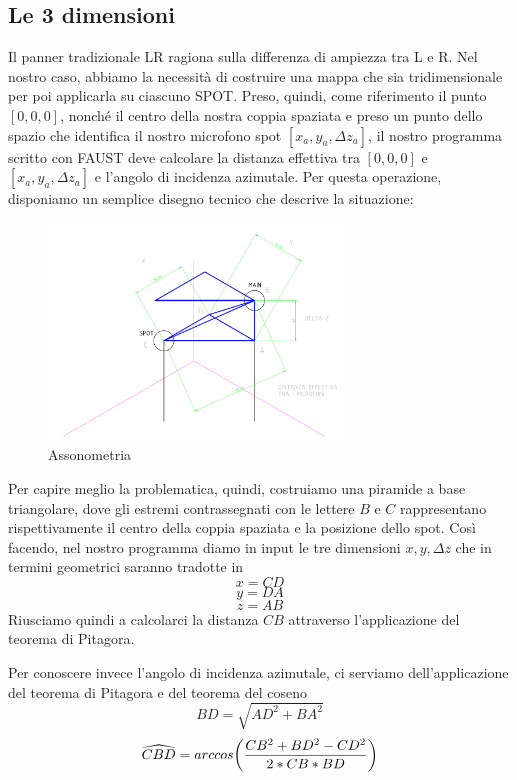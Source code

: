 \documentclass{article}
\begin{document}
    \subsection{Le 3 dimensioni}
    Il panner tradizionale LR ragiona sulla differenza di ampiezza tra L e R. Nel nostro caso, abbiamo la necessità di costruire una mappa che sia tridimensionale per poi applicarla su ciascuno SPOT. Preso, quindi, come riferimento il punto $\left[0,0,0\right]$, nonché il centro della nostra coppia spaziata e preso un punto dello spazio che identifica il nostro microfono spot $\left[x_a,y_a,\Delta z_a\right]$, il nostro programma scritto con FAUST deve calcolare
    la distanza effettiva tra $\left[0,0,0\right]$ e $\left[x_a,y_a,\Delta z_a\right]$ e l'angolo di incidenza azimutale. Per questa operazione, disponiamo un semplice disegno tecnico che descrive la situazione:

    \begin{figure}[H]
        \centering
        \includegraphics[width=0.7\textwidth]{images/Assonometria.png}
         \caption{\label{fig1}Assonometria}
    \end{figure}

    Per capire meglio la problematica, quindi, costruiamo una piramide a base triangolare, dove gli estremi contrassegnati con le lettere $B$ e $C$ rappresentano rispettivamente il centro della coppia spaziata e la posizione dello spot. Così facendo, nel nostro programma diamo in input le tre dimensioni $x, y, \Delta z$ che in termini geometrici saranno tradotte in
    $$x = CD$$
    $$y = DA$$
    $$z = AB$$
    Riusciamo quindi a calcolarci la distanza $CB$ attraverso l'applicazione del teorema di Pitagora.

    Per conoscere invece l'angolo di incidenza azimutale, ci serviamo dell'applicazione del teorema di Pitagora e del teorema del coseno
    $$BD = \sqrt{AD^2 + BA ^ 2}$$
    $$\widehat{CBD} = arccos \biggl( {CB ^ 2 + BD ^ 2 - CD ^ 2\over 2 * CB * BD} \biggr)$$
\end{document}
